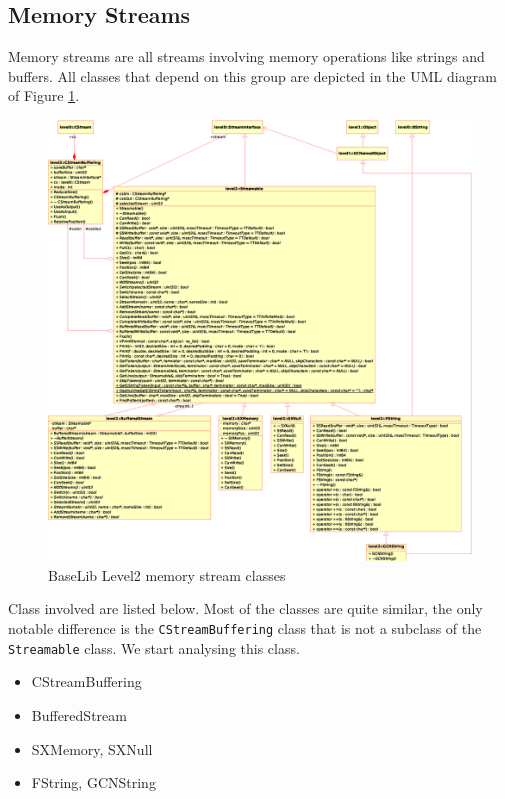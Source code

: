 \subsection{Memory Streams}
Memory streams are all streams involving memory operations like strings and buffers. All classes that depend on this group are depicted in the UML diagram of Figure \ref{f:level2:stream_mem}.
\begin{figure}[h!]
 \begin{center}
  \includegraphics[width=\textwidth]{level2/level2-mstream.eps}
  \caption{BaseLib Level2 memory stream classes}
  \label{f:level2:stream_mem}
 \end{center}
\end{figure}

Class involved are listed below. Most of the classes are quite similar, the only notable difference is the \texttt{CStreamBuffering} class that is not a subclass of the \texttt{Streamable} class. We start analysing this class.
\begin{itemize}
 \item CStreamBuffering
 \item BufferedStream
 \item SXMemory, SXNull
 \item FString, GCNString
\end{itemize}



